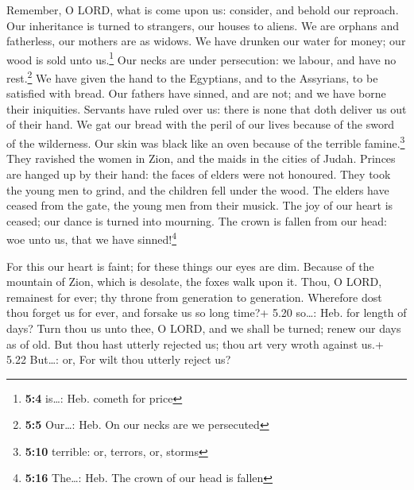  Remember, O LORD, what is come upon us: consider, and
behold our reproach.  Our inheritance is turned to
strangers, our houses to aliens.  We are orphans and
fatherless, our mothers are as widows.  We have drunken
our water for money; our wood is sold unto us.\footnote{\textbf{5:4}
  is\ldots: Heb. cometh for price}  Our necks are under
persecution: we labour, and have no rest.\footnote{\textbf{5:5}
  Our\ldots: Heb. On our necks are we persecuted}  We have
given the hand to the Egyptians, and to the Assyrians, to be satisfied
with bread.  Our fathers have sinned, and are not; and we
have borne their iniquities.  Servants have ruled over us:
there is none that doth deliver us out of their hand.  We
gat our bread with the peril of our lives because of the sword of the
wilderness.  Our skin was black like an oven because of
the terrible famine.\footnote{\textbf{5:10} terrible: or, terrors, or,
  storms}  They ravished the women in Zion, and the maids
in the cities of Judah.  Princes are hanged up by their
hand: the faces of elders were not honoured.  They took
the young men to grind, and the children fell under the wood.
 The elders have ceased from the gate, the young men from
their musick.  The joy of our heart is ceased; our dance
is turned into mourning.  The crown is fallen from our
head: woe unto us, that we have sinned!\footnote{\textbf{5:16}
  The\ldots: Heb. The crown of our head is fallen}

 For this our heart is faint; for these things our eyes
are dim.  Because of the mountain of Zion, which is
desolate, the foxes walk upon it.  Thou, O LORD,
remainest for ever; thy throne from generation to generation.
 Wherefore dost thou forget us for ever, and forsake us
so long time?+ 5.20 so\ldots: Heb. for length of days? 
Turn thou us unto thee, O LORD, and we shall be turned; renew our days
as of old.  But thou hast utterly rejected us; thou art
very wroth against us.+ 5.22 But\ldots: or, For wilt thou utterly reject
us?
